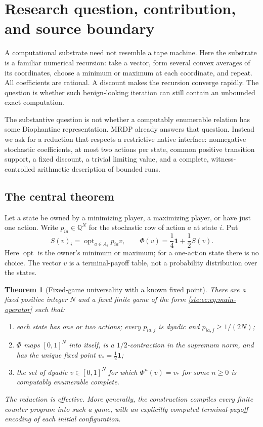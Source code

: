 \documentclass[11pt,letterpaper]{article}
\newtheorem{theorem}{Theorem}[section]
\theoremstyle{definition}
\theoremstyle{remark}
\newcommand{\Q}{\mathbb Q}
\newcommand{\one}{\mathbf 1}
\newcommand{\opt}{\operatorname{opt}}
\begin{document}
\section{Research question, contribution, and source boundary}
\label{ste:ec:sec:intro}

A computational substrate need not resemble a tape machine. Here the
substrate is a familiar numerical recursion: take a vector, form several
convex averages of its coordinates, choose a minimum or maximum at each
coordinate, and repeat. All coefficients are rational. A discount makes the
recursion converge rapidly. The question is whether such benign-looking
iteration can still contain an unbounded exact computation.

The substantive question is not whether a computably enumerable relation
has some Diophantine representation. MRDP already answers that question.
Instead we ask for a reduction that respects a restrictive native interface:
nonnegative stochastic coefficients, at most two actions per state, common
positive transition support, a fixed discount, a trivial limiting value,
and a complete, witness-controlled arithmetic description of bounded runs.

\subsection{The central theorem}

Let a state be owned by a minimizing player, a maximizing player, or have
just one action. Write $p_{ia}\in\Q^N$ for the stochastic row of action $a$
at state $i$. Put
\begin{equation}
 S(v)_i=\opt_{a\in A_i}p_{ia}v,
 \qquad
 \Phi(v)=\frac14\one+\frac12S(v).
 \label{ste:ec:eq:main-operator}
\end{equation}
Here $\opt$ is the owner's minimum or maximum; for a one-action state there
is no choice. The vector $v$ is a terminal-payoff table, not a probability
distribution over the states.

\begin{theorem}[Fixed-game universality with a known fixed point]
\label{ste:ec:thm:main}
There are a fixed positive integer $N$ and a fixed finite game of the form
\eqref{ste:ec:eq:main-operator} such that:
\begin{enumerate}[label=(\roman*)]
\item each state has one or two actions; every $p_{ia,j}$ is dyadic and
      $p_{ia,j}\geq 1/(2N)$;
\item $\Phi$ maps $[0,1]^N$ into itself, is a $1/2$-contraction in the
      supremum norm, and has the unique fixed point $v_* = \tfrac12\one$;
\item the set of dyadic $v\in[0,1]^N$ for which
      $\Phi^n(v)=v_*$ for some $n\geq0$ is computably enumerable complete.
\end{enumerate}
The reduction is effective. More generally, the construction compiles every
finite counter program into such a game, with an explicitly computed
terminal-payoff encoding of each initial configuration.
\end{theorem}
\end{document}
